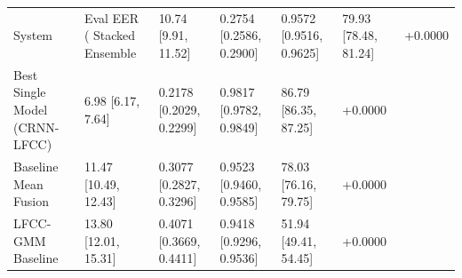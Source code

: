 \begin{tabular}{llllll}
\toprule
System & Eval EER (%
\midrule
Stacked Ensemble & 10.74 [9.91, 11.52] & 0.2754 [0.2586, 0.2900] & 0.9572 [0.9516, 0.9625] & 79.93 [78.48, 81.24] & +0.0000 \\
Best Single Model (CRNN-LFCC) & 6.98 [6.17, 7.64] & 0.2178 [0.2029, 0.2299] & 0.9817 [0.9782, 0.9849] & 86.79 [86.35, 87.25] & +0.0000 \\
Baseline Mean Fusion & 11.47 [10.49, 12.43] & 0.3077 [0.2827, 0.3296] & 0.9523 [0.9460, 0.9585] & 78.03 [76.16, 79.75] & +0.0000 \\
LFCC-GMM Baseline & 13.80 [12.01, 15.31] & 0.4071 [0.3669, 0.4411] & 0.9418 [0.9296, 0.9536] & 51.94 [49.41, 54.45] & +0.0000 \\
\bottomrule
\end{tabular}
